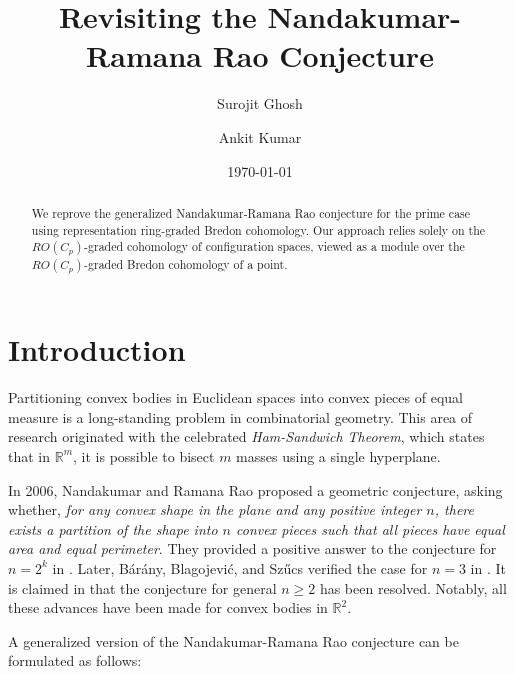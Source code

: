 \documentclass[a4paper,leqno,11pt]{amsart}
\theoremstyle{plain}
\theoremstyle{definition}
\theoremstyle{remark}
\begin{document}
\title{Revisiting the Nandakumar-Ramana Rao Conjecture}
\author{Surojit Ghosh}
\address{Department of Mathematics, Indian Institute of Technology, Roorkee, Uttarakhand-247667, India}
%

\author{Ankit Kumar}
\address{Department of Mathematics, Indian Institute of Technology, Roorkee, Uttarakhand-247667, India}
%
\date{\today}
%
%

\begin{abstract}
%
We reprove the generalized Nandakumar-Ramana Rao conjecture for the prime case using representation ring-graded Bredon cohomology. Our approach relies solely on the $RO(C_p)$-graded cohomology of configuration spaces,  viewed as a module over the $RO(C_p)$-graded Bredon cohomology of a point.
%  
\end{abstract}
%
\maketitle
 


\section{Introduction}
Partitioning convex bodies in Euclidean spaces into convex pieces of equal measure is a long-standing problem in combinatorial geometry. This area of research originated with the celebrated \emph{Ham-Sandwich Theorem}, which states that in \(\mathbb{R}^m\), it is possible to bisect \(m\) masses using a single hyperplane.


In 2006, Nandakumar and Ramana Rao proposed a geometric conjecture, asking whether, \emph{for any convex shape in the plane and any positive integer \(n\), there exists a partition of the shape into \(n\) convex pieces such that all pieces have equal area and equal perimeter}. They provided a positive answer to the conjecture for \(n = 2^k\) in \cite{Nan12}. Later, Bárány, Blagojević, and Szűcs verified the case for \(n = 3\) in \cite{Bar10}. It is claimed in \cite{AAK18} that the conjecture for general \(n \geq 2\) has been resolved. Notably, all these advances have been made for convex bodies in \(\mathbb{R}^2\).


A generalized version of the Nandakumar-Ramana Rao conjecture can be formulated as follows:
\end{document}
